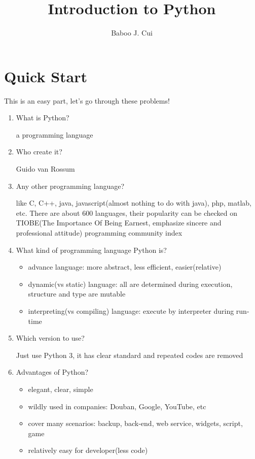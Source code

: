\documentclass[10pt,a4paper,oneside]{article}
\author{Baboo J. Cui}
\title{Introduction to Python}
\begin{document}
\maketitle
\tableofcontents

\newpage

\section{Quick Start}
This is an easy part, let's go through these problems!

\begin{enumerate}
	\item What is Python?
	
	a programming language
	
	\item Who create it?
	
	Guido van Rossum
	
	\item Any other programming language?
	
	like C, C++, java, javascript(almost nothing to do with java), php, matlab, etc. There are about $600$ languages, their popularity can be checked on TIOBE(The Importance Of Being Earnest, emphasize sincere and professional attitude) programming community index
	
	\item What kind of programming language Python is?
	\begin{itemize}
		\item advance language: more abstract,  less efficient, easier(relative)
		\item dynamic(vs static) language: all are determined during execution, structure and type are mutable
		\item interpreting(vs compiling) language: execute by interpreter during run-time 
	\end{itemize}
	
	\item Which version to use?
	
	Just use Python 3, it has clear standard and repeated codes are removed
	
	\item Advantages of Python?
	\begin{itemize}
		\item elegant, clear, simple
		\item wildly used in companies: Douban, Google, YouTube, etc
		\item cover many scenarios: backup, back-end, web service, widgets, script, game
		\item relatively easy for developer(less code)
	\end{itemize}
	

\end{enumerate}
\end{document}
